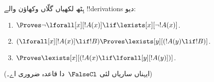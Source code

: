 \documentclass[../../../include/open-logic-section]{subfiles}
\begin{document}
\begin{prob}
ہِٹھ لکھیاں گلّاں وکھاؤن والے !!{derivation}s دیو:
\begin{enumerate}
\item $\Proves \lnot\lforall[x][!A(x)] \lif \lexists[x][\lnot!A(x)]$.
\item $(\lforall[x][!A(x)] \lif !B) \Proves \lexists[y][(!A(y) \lif !B)]$.
\item $\Proves \lexists[x][(!A(x) \lif \lforall[y][!A(y)])]$.
\end{enumerate}
(ایہناں ساریاں لئی $\FalseCl$~دا قاعدہ ضروری اے۔)
\end{prob}
\end{document}
